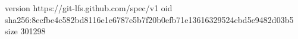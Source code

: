 version https://git-lfs.github.com/spec/v1
oid sha256:8ecfbe4c582bd8116e1e6787e5b7f20b0efb71e13616329524cbd5e9482d03b5
size 301298
